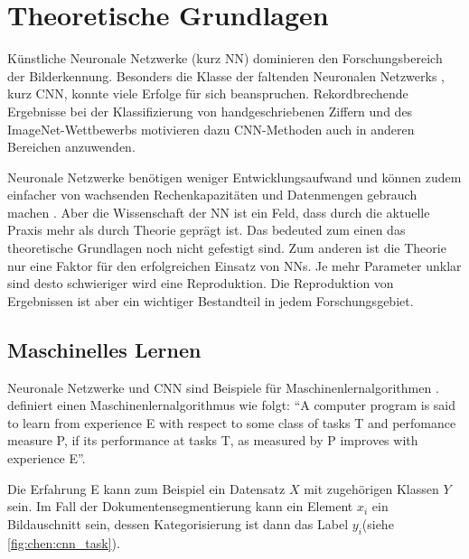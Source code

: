 \chapter{Theoretische Grundlagen}
\label{chap:theorie}
Künstliche Neuronale Netzwerke (kurz NN) dominieren den Forschungsbereich der 
Bilderkennung. 
Besonders die Klasse der faltenden Neuronalen Netzwerks , kurz CNN, konnte viele Erfolge für sich beanspruchen.
Rekordbrechende Ergebnisse bei der Klassifizierung von handgeschriebenen Ziffern \parencite{LeCunBackpropagationappliedhandwritten1989} und des ImageNet-Wettbewerbs \parencite{KrizhevskyImageNetClassificationDeep2012} motivieren dazu CNN-Methoden auch in anderen
Bereichen anzuwenden.


Neuronale Netzwerke benötigen weniger Entwicklungsaufwand und können zudem einfacher von 
 wachsenden Rechenkapazitäten und Datenmengen gebrauch machen \parencite[436]{LeCunDeeplearning2015}. 
Aber die Wissenschaft der NN ist ein Feld, dass durch die aktuelle Praxis mehr als durch Theorie geprägt ist. 
Das bedeuted zum einen das theoretische Grundlagen noch nicht gefestigt sind.
Zum anderen ist die Theorie nur eine Faktor für den erfolgreichen Einsatz von NNs. 
Je mehr Parameter unklar sind desto schwieriger wird eine Reproduktion.
Die Reproduktion von Ergebnissen ist aber ein wichtiger Bestandteil in jedem Forschungsgebiet. 

\section{Maschinelles Lernen}
Neuronale Netzwerke und CNN sind Beispiele für Maschinenlernalgorithmen .
\cite{MitchellMachinelearning1997} definiert einen Maschinenlernalgorithmus wie folgt: ``A computer program is said to learn from experience E with respect to some class of tasks T and perfomance measure P, if its performance at tasks T, as measured by P improves with experience E''.

Die Erfahrung E kann zum Beispiel ein Datensatz \(X\) mit zugehörigen Klassen
\(Y\) sein. 
Im Fall der Dokumentensegmentierung kann ein Element \(x_i\) ein Bildauschnitt sein, 
dessen Kategorisierung ist dann das Label \(y_i\)(siehe \cref{fig:chen:cnn_task}).




